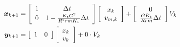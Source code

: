 \begin{align}
  \bm x_{k+1} &= \left[
  \begin{array}{cc}
    1 & \Delta t \\
    0 & 1 - \frac{K_t G^2}{R^2rmK_v} \Delta t
  \end{array}
  \right] \left[
  \begin{array}{c}
    x_k \\
    v_{m,k} \\
  \end{array}
  \right] + \left[
  \begin{array}{c}
    0 \\
    \frac{GK_t}{Rrm} \Delta t
  \end{array}
  \right] V_k \\
  \bm y_{k+1} &= \left[
  \begin{array}{cc}
    1 & 0
  \end{array}
  \right] \left[
  \begin{array}{c}
    x_k \\
    v_k \\
  \end{array}
  \right] + 0 \cdot V_k
\end{align}
